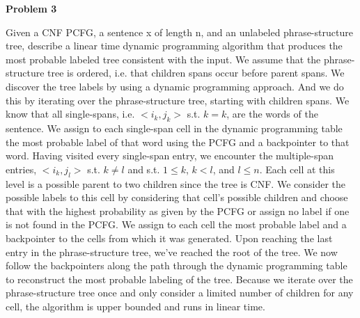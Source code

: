{\bf Problem 3}

Given a CNF PCFG, a sentence x of length n, and an unlabeled phrase-structure tree, describe a linear time dynamic programming algorithm that produces the most probable labeled tree consistent with the input.
We assume that the phrase-structure tree is ordered, i.e. that children spans occur before parent spans.
We discover the tree labels by using a dynamic programming approach.
And we do this by iterating over the phrase-structure tree, starting with children spans.
We know that all single-spans, i.e. $<i_k, j_k>$ s.t. $k=k$, are the words of the sentence.
We assign to each single-span cell in the dynamic programming table the most probable label of that word using the PCFG and a backpointer to that word.
Having visited every single-span entry, we encounter the multiple-span entries, $<i_k, j_l>$ s.t. $k \neq l$ and s.t. $1 \leq k$, $k < l$, and $l\leq n$.
Each cell at this level is a possible parent to two children since the tree is CNF.
We consider the possible labels to this cell by considering that cell's possible children and choose that with the highest probability as given by the PCFG or assign no label if one is not found in the PCFG.
We assign to each cell the most probable label and a backpointer to the cells from which it was generated.
Upon reaching the last entry in the phrase-structure tree, we've reached the root of the tree. 
We now follow the backpointers along the path through the dynamic programming table to reconstruct the most probable labeling of the tree.
Because we iterate over the phrase-structure tree once and only consider a limited number of children for any cell, the algorithm is upper bounded and runs in linear time.
